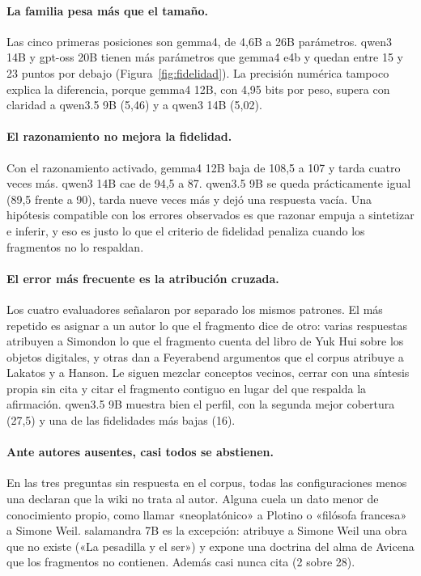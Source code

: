 \documentclass{article}
\begin{document}
\paragraph{La familia pesa más que el tamaño.} Las cinco primeras posiciones
son gemma4, de 4,6B a 26B parámetros. qwen3 14B y gpt-oss 20B tienen más
parámetros que gemma4 e4b y quedan entre 15 y 23 puntos por debajo
(Figura~\ref{fig:fidelidad}). La precisión numérica tampoco explica la
diferencia, porque gemma4 12B, con 4,95 bits por peso, supera con claridad a
qwen3.5 9B (5,46) y a qwen3 14B (5,02).

\paragraph{El razonamiento no mejora la fidelidad.} Con el razonamiento
activado, gemma4 12B baja de 108,5 a 107 y tarda cuatro veces más. qwen3 14B
cae de 94,5 a 87. qwen3.5 9B se queda prácticamente igual (89,5 frente a 90),
tarda nueve veces más y dejó una respuesta vacía. Una hipótesis compatible
con los errores observados es que razonar empuja a sintetizar e inferir, y
eso es justo lo que el criterio de fidelidad penaliza cuando los fragmentos
no lo respaldan.

\paragraph{El error más frecuente es la atribución cruzada.} Los cuatro
evaluadores señalaron por separado los mismos patrones. El más repetido es
asignar a un autor lo que el fragmento dice de otro: varias respuestas
atribuyen a Simondon lo que el fragmento cuenta del libro de Yuk Hui sobre
los objetos digitales, y otras dan a Feyerabend argumentos que el corpus
atribuye a Lakatos y a Hanson. Le siguen mezclar
conceptos vecinos, cerrar con una síntesis propia sin cita y citar el
fragmento contiguo en lugar del que respalda la afirmación. qwen3.5 9B
muestra bien el perfil, con la segunda mejor cobertura (27,5) y una de las
fidelidades más bajas (16).

\paragraph{Ante autores ausentes, casi todos se abstienen.} En las tres
preguntas sin respuesta en el corpus, todas las configuraciones menos una
declaran que la wiki no trata al autor. Alguna cuela un dato menor de
conocimiento propio, como llamar «neoplatónico» a Plotino o «filósofa
francesa» a Simone Weil. salamandra 7B es la excepción: atribuye a Simone
Weil una obra que no existe («La pesadilla y el ser») y expone una doctrina
del alma de Avicena que los fragmentos no contienen. Además casi nunca cita (2 sobre 28).
\end{document}
